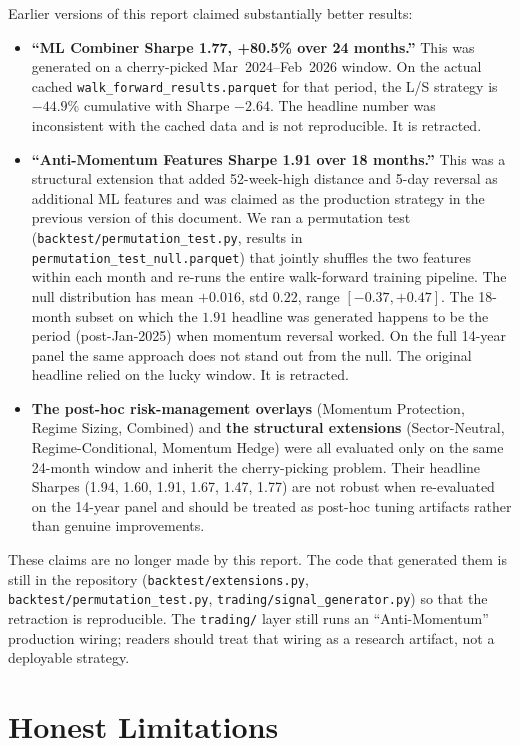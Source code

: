 \documentclass[11pt,a4paper]{article}
\begin{document}
Earlier versions of this report claimed substantially better results:
\begin{itemize}[noitemsep]
    \item \textbf{``ML Combiner Sharpe 1.77, +80.5\% over 24 months.''} This was generated on a cherry-picked Mar~2024--Feb~2026 window. On the actual cached \texttt{walk\_forward\_results.parquet} for that period, the L/S strategy is $-44.9\%$ cumulative with Sharpe $-2.64$. The headline number was inconsistent with the cached data and is not reproducible. It is retracted.
    \item \textbf{``Anti-Momentum Features Sharpe 1.91 over 18 months.''} This was a structural extension that added 52-week-high distance and 5-day reversal as additional ML features and was claimed as the production strategy in the previous version of this document. We ran a permutation test (\texttt{backtest/permutation\_test.py}, results in \texttt{permutation\_test\_null.parquet}) that jointly shuffles the two features within each month and re-runs the entire walk-forward training pipeline. The null distribution has mean $+0.016$, std $0.22$, range $[-0.37, +0.47]$. The 18-month subset on which the $1.91$ headline was generated happens to be the period (post-Jan-2025) when momentum reversal worked. On the full 14-year panel the same approach does not stand out from the null. The original headline relied on the lucky window. It is retracted.
    \item \textbf{The post-hoc risk-management overlays} (Momentum Protection, Regime Sizing, Combined) and \textbf{the structural extensions} (Sector-Neutral, Regime-Conditional, Momentum Hedge) were all evaluated only on the same 24-month window and inherit the cherry-picking problem. Their headline Sharpes (1.94, 1.60, 1.91, 1.67, 1.47, 1.77) are not robust when re-evaluated on the 14-year panel and should be treated as post-hoc tuning artifacts rather than genuine improvements.
\end{itemize}

These claims are no longer made by this report. The code that generated them is still in the repository (\texttt{backtest/extensions.py}, \texttt{backtest/permutation\_test.py}, \texttt{trading/signal\_generator.py}) so that the retraction is reproducible. The \texttt{trading/} layer still runs an ``Anti-Momentum'' production wiring; readers should treat that wiring as a research artifact, not a deployable strategy.

\section{Honest Limitations}
\label{sec:limitations}
\end{document}

